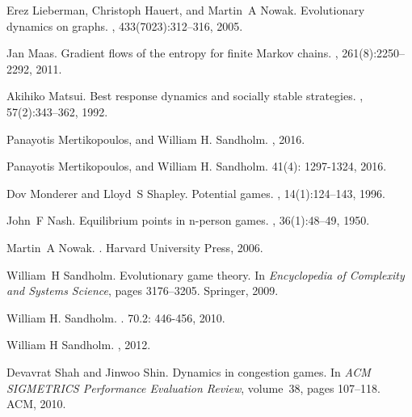 \documentclass[11pt,reqno]{amsart}
\begin{document}
\begin{thebibliography}{10}
Erez Lieberman, Christoph Hauert, and Martin~A Nowak.
\newblock Evolutionary dynamics on graphs.
, 433(7023):312--316, 2005.


Jan Maas.
\newblock Gradient flows of the entropy for finite Markov chains.
, 261(8):2250--2292, 2011.

Akihiko Matsui.
\newblock Best response dynamics and socially stable strategies.
, 57(2):343--362, 1992.


Panayotis Mertikopoulos, and William H. Sandholm. 
, 2016.

Panayotis Mertikopoulos, and William H. Sandholm. 
 41(4): 1297-1324, 2016.



Dov Monderer and Lloyd~S Shapley.
\newblock Potential games.
, 14(1):124--143, 1996.

John~F Nash.
\newblock Equilibrium points in n-person games.
, 36(1):48--49,
  1950.

Martin~A Nowak.
.
\newblock Harvard University Press, 2006.


William~H Sandholm.
\newblock Evolutionary game theory.
\newblock In {\em Encyclopedia of Complexity and Systems Science}, pages
  3176--3205. Springer, 2009.


William H. Sandholm. 
. 70.2: 446-456, 2010.


William H Sandholm. 
 , 2012.


Devavrat Shah and Jinwoo Shin.
\newblock Dynamics in congestion games.
\newblock In {\em ACM SIGMETRICS Performance Evaluation Review}, volume~38,
  pages 107--118. ACM, 2010.


\end{thebibliography}
\end{document}
